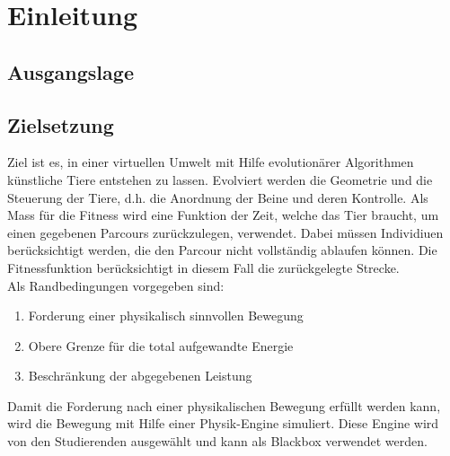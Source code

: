 %
%


\chapter{Einleitung}
  \lipsum[33-35]

\section{Ausgangslage}

\section{Zielsetzung}
  Ziel ist es, in einer virtuellen Umwelt mit Hilfe evolutionärer Algorithmen künstliche Tiere entstehen zu lassen.
  Evolviert werden die Geometrie und die Steuerung der Tiere, d.h. die Anordnung der Beine und deren Kontrolle.
  Als Mass für die Fitness wird eine Funktion der Zeit, welche das Tier braucht,
  um einen gegebenen Parcours zurückzulegen, verwendet.
  Dabei müssen Individiuen berücksichtigt werden,
  die den Parcour nicht vollständig ablaufen können.
  Die Fitnessfunktion berücksichtigt in diesem Fall die zurückgelegte Strecke.\\
  Als Randbedingungen vorgegeben sind:
  \begin{enumerate}
    \item Forderung einer physikalisch sinnvollen Bewegung
    \item Obere Grenze für die total aufgewandte Energie
    \item Beschränkung der abgegebenen Leistung
  \end{enumerate}
  Damit die Forderung nach einer physikalischen Bewegung erfüllt werden kann,
  wird die Bewegung mit Hilfe einer Physik-Engine simuliert.
  Diese Engine wird von den Studierenden ausgewählt und kann als Blackbox verwendet werden.
